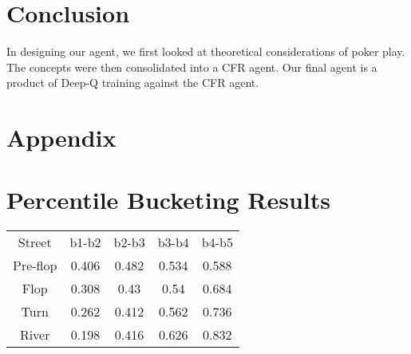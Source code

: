 \documentclass{article}
\begin{document}
\section{Conclusion}

In designing our agent, we first looked at theoretical considerations of poker play. The concepts were then consolidated into a CFR agent. Our final agent is a product of Deep-Q training against the CFR agent.




\appendix
\section{Appendix}

\section{Percentile Bucketing Results}
\begin{center}
\begin{tabular}{ c c c c c }
Street & b1-b2 & b2-b3 & b3-b4 & b4-b5\\
Pre-flop & 0.406 & 0.482 & 0.534 & 0.588\\ 
Flop & 0.308 & 0.43 & 0.54 & 0.684\\
Turn & 0.262 & 0.412 & 0.562 & 0.736\\
River & 0.198 & 0.416 & 0.626 & 0.832
\end{tabular}
\end{center}
\end{document}
